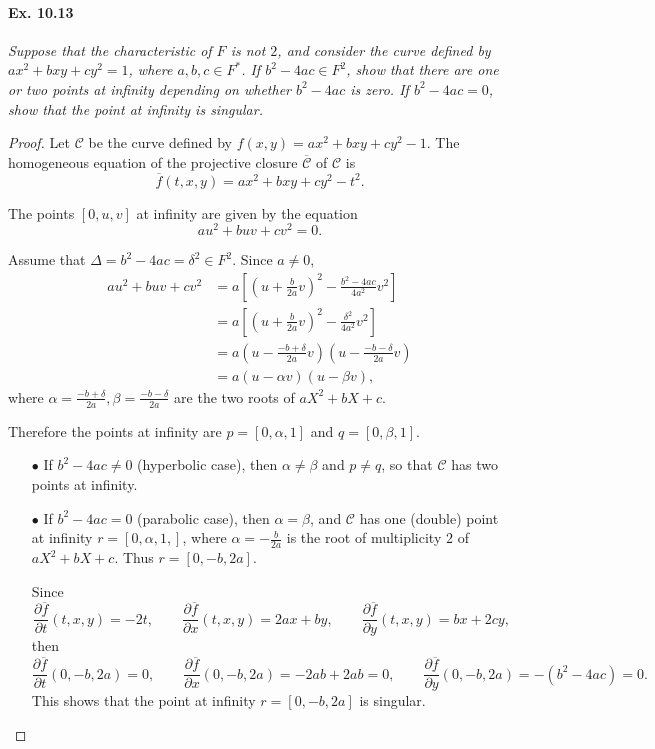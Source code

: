 \documentclass[11pt,a4paper]{article}
\begin{document}
\paragraph{Ex. 10.13} {\it Suppose that the characteristic of $F$ is not $2$, and consider the curve defined by $ax^2+bxy+cy^2 = 1$, where $a,b,c \in F^*$. If $b^2 -4ac \in F^2$, show that there are one or two points at infinity depending on whether $b^2 -4ac$ is zero. If $b^2 -4ac = 0$, show that the point at infinity is singular.
}
\begin{proof}
Let $\mathscr{C}$ be the curve defined by $f(x,y) = ax^2+bxy+cy^2 -1$. The homogeneous equation of the projective closure $\overline{\mathscr{C}}$ of $\mathscr{C}$ is
$$\overline{f}(t,x,y) = ax^2+bxy+cy^2 -t^2.$$

The points $[0,u,v]$ at infinity are given by the equation
$$au^2 + buv + cv^2 = 0.$$

Assume that $\Delta = b^2 - 4ac = \delta^2 \in F^2$. Since $a \ne 0$,
\begin{align*}
au^2 + buv + c v^2 &= a \left[ \left(u+ \frac{b}{2a} v\right)^2 - \frac{b^2 - 4ac}{4a^2} v^2\right]\\
&= a \left[ \left(u+ \frac{b}{2a} v\right)^2 - \frac{\delta^2}{4a^2} v^2\right]\\
&= a \left( u - \frac{-b+\delta}{2a} v \right)  \left( u - \frac{-b-\delta}{2a} v \right) \\
&= a( u - \alpha v)(u - \beta v),
\end{align*}
where $\alpha = \frac{-b+\delta}{2a}, \beta = \frac{-b-\delta}{2a}$ are the two roots of $aX^2 + b X +c$.

Therefore the points at infinity are $p = [0,\alpha, 1]$ and $q = [0,\beta, 1]$.

\begin{enumerate}
\item[$\bullet$] If $b^2 - 4ac \ne 0$ (hyperbolic case), then $\alpha \ne \beta$ and $p \ne q$, so that $\mathscr{C}$ has two points at infinity.

\item[$\bullet$] If $b^2 - 4ac = 0$ (parabolic case), then  $\alpha = \beta$, and $\mathscr{C}$ has one  (double) point  at infinity $r = [0,\alpha, 1,]$, where $\alpha = -\frac{b}{2a}$ is the root of multiplicity $2$ of $aX^2 + b X +c$. Thus $r=[0, -b, 2a]$.

Since
$$\frac{\partial \overline{f}}{\partial t} (t,x,y)= -2t, \qquad \frac{\partial \overline{f}}{\partial x}(t,x,y) = 2ax + by,\qquad  \frac{\partial \overline{f}}{\partial y}(t,x,y) =  bx + 2c y,$$
then
$$\frac{\partial \overline{f}}{\partial t}(0,-b,2a) = 0, \qquad \frac{\partial \overline{f}}{\partial x}(0,-b,2a) = -2ab + 2ab =  0,\qquad  \frac{\partial \overline{f}}{\partial y}(0,-b,2a) = -(b^2 - 4ac) =  0.$$
This shows that the point at infinity $r = [0,-b,2a]$ is singular.
\end{enumerate}
\end{proof}
\end{document}
